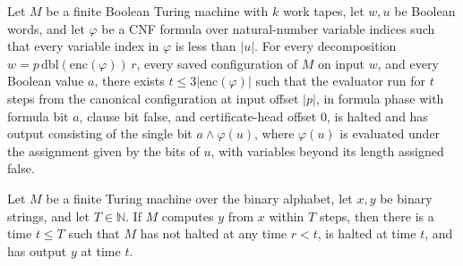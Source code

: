 \begin{lemma}
\label{Complexity.satEval_formula}
\leanok
{}
Let $M$ be a finite Boolean Turing machine with $k$ work tapes, let $w,u$ be Boolean
words, and let $\varphi$ be a CNF formula over natural-number variable indices such that
every variable index in $\varphi$ is less than $|u|$. For every decomposition
$w=p\,\mathrm{dbl}(\mathrm{enc}(\varphi))\,r$, every saved configuration of $M$ on input
$w$, and every Boolean value $a$, there exists $t\le 3|\mathrm{enc}(\varphi)|$ such that
the evaluator run for $t$ steps from the canonical configuration at input offset $|p|$,
in formula phase with formula bit $a$, clause bit false, and certificate-head offset
$0$, is halted and has output consisting of the single bit $a\wedge\varphi(u)$, where
$\varphi(u)$ is evaluated under the assignment given by the bits of $u$, with variables
beyond its length assigned false.
\end{lemma}

\begin{lemma}
\label{Complexity.sat_first_halt}
\leanok
{}
Let $M$ be a finite Turing machine over the binary alphabet, let $x,y$ be binary
strings, and let $T\in\mathbb{N}$. If $M$ computes $y$ from $x$ within $T$ steps, then
there is a time $t\le T$ such that $M$ has not halted at any time $r<t$, is halted at
time $t$, and has output $y$ at time $t$.
\end{lemma}

